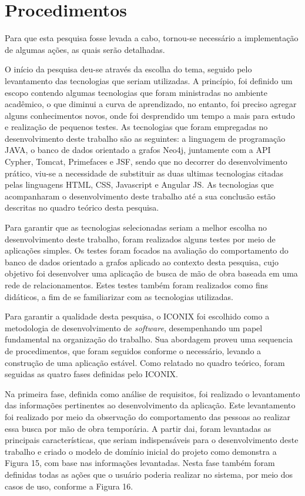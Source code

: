 \section{Procedimentos}

\par Para que esta pesquisa fosse levada a cabo, tornou-se necessário a implementação de algumas ações, as quais serão detalhadas.

\par O início da pesquisa deu-se através da escolha do tema, seguido pelo levantamento das tecnologias que seriam utilizadas. A princípio, foi definido um escopo contendo algumas tecnologias que foram ministradas no ambiente acadêmico, o que diminui a curva de aprendizado, no entanto, foi preciso agregar alguns conhecimentos novos, onde foi desprendido um tempo a mais para estudo e realização de pequenos testes. As tecnologias que foram empregadas no desenvolvimento deste trabalho são as seguintes: a linguagem de programação JAVA, o banco de dados orientado a grafos Neo4j, juntamente com a API Cypher, Tomcat, Primefaces e JSF, sendo que no decorrer do desenvolvimento prático, viu-se a necessidade de substituir as duas ultimas tecnologias citadas pelas linguagens HTML, CSS, Javascript e Angular JS. As tecnologias que acompanharam o desenvolvimento deste trabalho até a sua conclusão estão descritas no quadro teórico desta pesquisa.

\par Para garantir que as tecnologias selecionadas seriam a melhor escolha no desenvolvimento deste trabalho, foram realizados alguns testes por meio de aplicações simples. Os testes foram focados na avaliação do comportamento do banco de dados orientado a grafos aplicado ao contexto desta pesquisa, cujo objetivo foi desenvolver uma aplicação de busca de mão de obra baseada em uma rede de relacionamentos. Estes testes também foram realizados como fins didáticos, a fim de se familiarizar com as tecnologias utilizadas.

\par Para garantir a qualidade desta pesquisa, o ICONIX foi escolhido como a metodologia de desenvolvimento de \textit{software}, desempenhando um papel fundamental na organização do trabalho. Sua abordagem proveu uma sequencia de procedimentos, que foram seguidos conforme o necessário, levando a construção de uma aplicação estável. Como relatado no quadro teórico, foram seguidas as quatro fases definidas pelo ICONIX.

\par Na primeira fase, definida como análise de requisitos, foi realizado o levantamento das informações pertinentes ao desenvolvimento da aplicação. Este levantamento foi realizado por meio da observação do comportamento das pessoas ao realizar essa busca por mão de obra temporária. A partir dai, foram levantadas as principais características, que seriam indispensáveis para o desenvolvimento deste trabalho e criado o modelo de domínio inicial do projeto como demonstra a Figura 15, com base nas informações levantadas. Nesta fase também foram definidas todas as ações que o usuário poderia realizar no sistema, por meio dos casos de uso, conforme a Figura 16.

